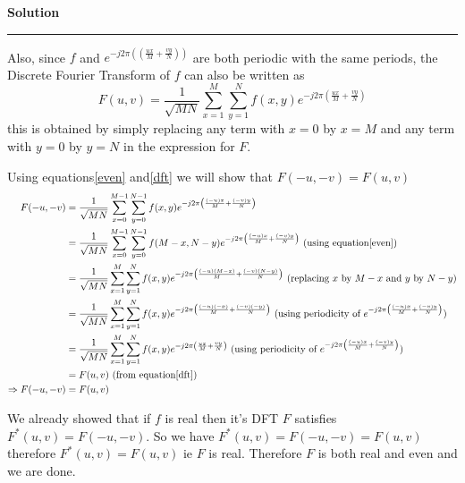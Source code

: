 \documentclass[a4paper]{article}
\newenvironment{solution}[2][]{%
    \begin{mdframed}[linecolor=green!60!black, linewidth=2pt, roundcorner=10pt, backgroundcolor=green!5!white, skipabove=12pt, skipbelow=12pt]%
        \textbf{\large #2} %
        \par\noindent\rule{\textwidth}{0.4pt} %
        \vspace{0.5em} %
}{%
    \end{mdframed}%
}
\begin{document}
\begin{solution}{Solution}
  Also, since $f$ and $e^{-j 2\pi \left((\frac{ux}{M} + \frac{vy}{N})\right)}$ are both periodic with the same periods,
  the Discrete Fourier Transform of $f$ can also be written as 
  \begin{equation}
    \label{dft}F(u,v) = \frac{1}{\sqrt{MN}}\sum\limits_{x = 1}^{M}\sum\limits_{y = 1}^{N} f(x,y) e^{-j2\pi \left(\frac{ux}{M} + \frac{vy}{N}\right)}
  \end{equation}
  this is obtained by simply replacing any term with $x = 0$ by $x = M$ and any term with $y = 0$ by $y = N$ in the expression for $F$.

  Using equations\ref{even} and\ref{dft} we will show that $F(-u,-v) = F(u,v)$
  \begin{align}
    F(-u,-v) 
    &= \frac{1}{\sqrt{MN}}\sum\limits_{x = 0}^{M - 1}\sum\limits_{y = 0}^{N - 1} f(x,y) 
    e^{-j2\pi \left(\frac{(-u)x}{M} + \frac{(-v)y}{N}\right)}  \nonumber\\   
    &= \frac{1}{\sqrt{MN}}\sum\limits_{x = 0}^{M - 1}\sum\limits_{y = 0}^{N - 1} f(M - x,N - y) 
    e^{-j2\pi \left(\frac{(-u)x}{M} + \frac{(-v)y}{N}\right)} \text{ (using equation\ref{even})} \nonumber \\
    &= \frac{1}{\sqrt{MN}}\sum\limits_{x = 1}^{M}\sum\limits_{y = 1}^{N} f(x,y) 
    e^{-j2\pi \left(\frac{(-u)(M - x)}{M} + \frac{(-v)(N - y)}{N}\right)}  \text{ (replacing $x$ by $M - x$ and $y$ by $N - y$)}\nonumber \\
    &= \frac{1}{\sqrt{MN}}\sum\limits_{x = 1}^{M}\sum\limits_{y = 1}^{N} f(x,y) 
    e^{-j2\pi \left(\frac{(-u)(-x)}{M} + \frac{(-v)(-y)}{N}\right)}  \text{ (using periodicity of $e^{-j2\pi \left(\frac{(-u)x}{M} + \frac{(-v)y}{N}\right)}$)}\nonumber \\
    &= \frac{1}{\sqrt{MN}}\sum\limits_{x = 1}^{M}\sum\limits_{y = 1}^{N} f(x,y) 
    e^{-j2\pi \left(\frac{ux}{M} + \frac{vy}{N}\right)}  \text{ (using periodicity of $e^{-j2\pi \left(\frac{(-u)x}{M} + \frac{(-v)y}{N}\right)}$)}\nonumber \\
    &= F(u,v) \text{ (from equation\ref{dft})} \nonumber \\
    \Rightarrow F(-u,-v) &= F(u,v)
  \end{align}

  We already showed that if $f$ is real then it's DFT $F$ satisfies $F^{*}(u,v) = F(-u,-v)$. So we have $F^{*}(u,v) = F(-u,-v) = F(u,v)$
  therefore $F^{*}(u,v) = F(u,v)$ ie $F$ is real. Therefore $F$ is both real and even and we are done.
\end{solution}
\end{document}
